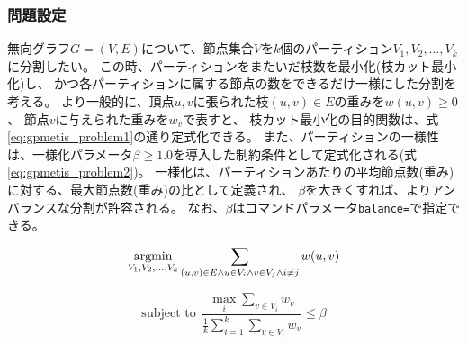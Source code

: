 \subsubsection{問題設定}
無向グラフ$G=(V,E)$について、節点集合$V$を$k$個のパーティション$V_1,V_2,\dots,V_k$に分割したい。
この時、パーティションをまたいだ枝数を最小化(枝カット最小化)し、
かつ各パーティションに属する節点の数をできるだけ一様にした分割を考える。
より一般的に、頂点$u,v$に張られた枝$(u,v)\in E$の重みを$w(u,v)\ge 0$、
節点$v$に与えられた重みを$w_v$で表すと、
枝カット最小化の目的関数は、式\ref{eq:gpmetis_problem1}の通り定式化できる。
また、パーティションの一様性は、一様化パラメータ$\beta\ge 1.0$を導入した制約条件として定式化される(式\ref{eq:gpmetis_problem2})。
一様化は、パーティションあたりの平均節点数(重み)に対する、最大節点数(重み)の比として定義され、
$\beta$を大きくすれば、よりアンバランスな分割が許容される。
なお、$\beta$はコマンドパラメータ\verb|balance=|で指定できる。


{\footnotesize
\begin{equation}
\mathop{\rm argmin}\limits_{V_1,V_2,\dots,V_k} \sum_{(u,v)\in E \wedge u\in V_i \wedge v\in V_j \wedge i\ne j} w(u,v) \\
\label{eq:gpmetis_problem1}
\end{equation}
}

{\footnotesize
\begin{equation}
\textrm{subject to}\ \ \frac{\max_i \sum_{v\in V_i} w_v}{\frac{1}{k} \sum_{i=1}^k \sum_{v\in V_i} w_v} \le \beta
\label{eq:gpmetis_problem2}
\end{equation}
}



